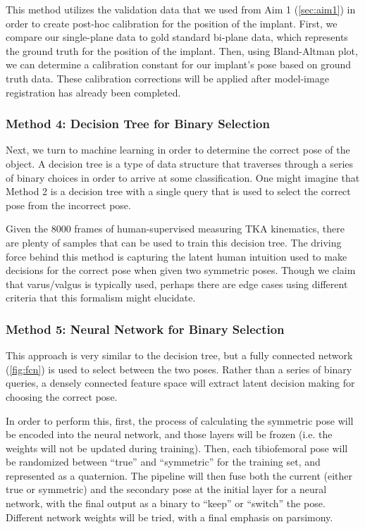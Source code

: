 This method utilizes the validation data that we used from Aim 1 (\cref{sec:aim1}) in order to create post-hoc calibration for the position of the implant. First, we compare our single-plane data to gold standard bi-plane data, which represents the ground truth for the position of the implant. Then, using Bland-Altman plot, we can determine a calibration constant for our implant's pose based on ground truth data. These calibration corrections will be applied after model-image registration has already been completed.

\subsubsection{Method 4: Decision Tree for Binary Selection}

Next, we turn to machine learning in order to determine the correct pose of the object. A decision tree is a type of data structure that traverses through a series of binary choices in order to arrive at some classification. One might imagine that Method 2 is a decision tree with a single query that is used to select the correct pose from the incorrect pose. 

Given the 8000 frames of human-supervised measuring TKA kinematics, there are plenty of samples that can be used to train this decision tree. The driving force behind this method is capturing the latent human intuition used to make decisions for the correct pose when given two symmetric poses. Though we claim that varus/valgus is typically used, perhaps there are edge cases using different criteria that this formalism might elucidate.

\subsubsection{Method 5: Neural Network for Binary Selection}
This approach is very similar to the decision tree, but a fully connected network (\cref{fig:fcn}) is used to select between the two poses. Rather than a series of binary queries, a densely connected feature space will extract latent decision making for choosing the correct pose.

In order to perform this, first, the process of calculating the symmetric pose will be encoded into the neural network, and those layers will be frozen (i.e. the weights will not be updated during training). Then, each tibiofemoral pose will be randomized between ``true'' and ``symmetric'' for the training set, and represented as a quaternion. The pipeline will then fuse both the current (either true or symmetric) and the secondary pose at the initial layer for a neural network, with the final output as a binary to ``keep'' or ``switch'' the pose. Different network weights will be tried, with a final emphasis on parsimony.
